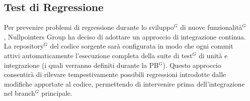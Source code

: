 \subsection{Test di Regressione}
Per prevenire problemi di regressione durante lo sviluppo$^G$ di nuove funzionalità$^G$, Nullpointers Group ha deciso di adottare un approccio di integrazione continua.
La repository$^G$ del codice sorgente sarà configurata in modo che ogni commit attivi automaticamente l'esecuzione completa della suite di test$^G$ di unità e integrazione (i quali verranno definiti durante la PB$^G$).
Questo approccio consentirà di rilevare tempestivamente possibili regressioni introdotte dalle modifiche apportate al codice, permettendo di intervenire prima dell'integrazione nel branch$^G$ principale.
